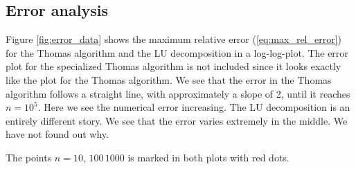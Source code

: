 \documentclass{emulateapj}
\begin{document}
\subsection{Error analysis}

Figure \ref{fig:error_data} shows the maximum relative error (\ref{eq:max_rel_error}) for the Thomas algorithm and the LU decomposition in a log-log-plot. The error plot for the specialized Thomas algorithm is not included since it looks exactly like the plot for the Thomas algorithm. We see that the error in the Thomas algorithm follows a straight line, with approximately a slope of 2, until it reaches \(n=10^{5}\). Here we see the numerical error increasing. The LU decomposition is an entirely different story. We see that the error varies extremely in the middle. We have not found out why. 

The points \(n=10,\,100\,1000\) is marked in both plots with red dots.
\end{document}
